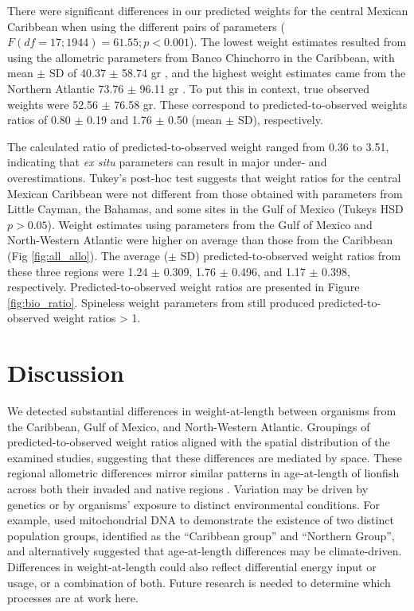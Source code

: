 \documentclass[]{article}
\theoremstyle{definition}
\theoremstyle{definition}
\theoremstyle{definition}
\theoremstyle{remark}
\begin{document}
There were significant differences in our predicted weights for the
central Mexican Caribbean when using the different pairs of parameters
(\(F(df = 17; 1944) = 61.55; p < 0.001\)). The lowest weight estimates
resulted from using the allometric parameters from Banco Chinchorro in
the Caribbean, with mean \(\pm\) SD of 40.37 \(\pm\) 58.74 gr
\citep{sabidoitz_2016}, and the highest weight estimates came from the
Northern Atlantic 73.76 \(\pm\) 96.11 gr \citep{barbour_2011}. To put
this in context, true observed weights were 52.56 \(\pm\) 76.58 gr.
These correspond to predicted-to-observed weights ratios of 0.80 \(\pm\)
0.19 and 1.76 \(\pm\) 0.50 (mean \(\pm\) SD), respectively.

The calculated ratio of predicted-to-observed weight ranged from 0.36 to
3.51, indicating that \emph{ex situ} parameters can result in major
under- and overestimations. Tukey's post-hoc test suggests that weight
ratios for the central Mexican Caribbean were not different from those
obtained with parameters from Little Cayman, the Bahamas, and some sites
in the Gulf of Mexico (Tukeys HSD \(p > 0.05\)). Weight estimates using
parameters from the Gulf of Mexico and North-Western Atlantic were
higher on average than those from the Caribbean (Fig
\ref{fig:all_allo}). The average (\(\pm\) SD) predicted-to-observed
weight ratios from these three regions were 1.24 \(\pm\) 0.309, 1.76
\(\pm\) 0.496, and 1.17 \(\pm\) 0.398, respectively.
Predicted-to-observed weight ratios are presented in Figure
\ref{fig:bio_ratio}. Spineless weight parameters from \citet{fogg_2013}
still produced predicted-to-observed weight ratios \textgreater{} 1.

\section{Discussion}\label{discussion}

We detected substantial differences in weight-at-length between
organisms from the Caribbean, Gulf of Mexico, and North-Western
Atlantic. Groupings of predicted-to-observed weight ratios aligned with
the spatial distribution of the examined studies, suggesting that these
differences are mediated by space. These regional allometric differences
mirror similar patterns in age-at-length of lionfish across both their
invaded and native regions \citep{pusack_2016}. Variation may be driven
by genetics or by organisms' exposure to distinct environmental
conditions. For example, \citet{betancurr_2011} used mitochondrial DNA
to demonstrate the existence of two distinct population groups,
identified as the ``Caribbean group'' and ``Northern Group'', and
\citet{fogg_2015} alternatively suggested that age-at-length differences
may be climate-driven. Differences in weight-at-length could also
reflect differential energy input or usage, or a combination of both.
Future research is needed to determine which processes are at work here.
\end{document}
